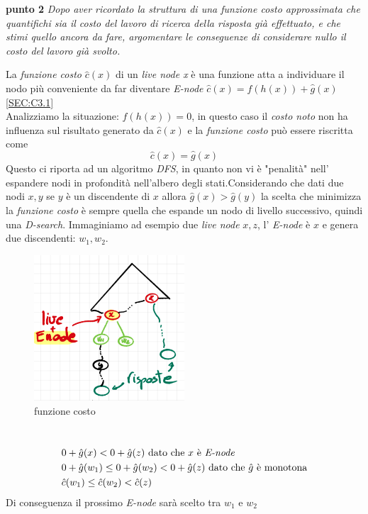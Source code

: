 \documentclass[a4paper]{article}
\begin{document}
\textbf{punto 2}
\emph{Dopo aver ricordato la struttura di una funzione costo approssimata che quantifichi sia il costo del lavoro di ricerca della risposta già effettuato, e che stimi quello ancora da fare, argomentare le conseguenze di considerare nullo il costo del lavoro già svolto.}
\begin{adjustwidth}{.8cm}{0cm}
	La \textit{funzione costo} $\hat c(x)$ di un \textit{live node x} è una funzione atta a individuare il nodo più conveniente da far diventare \textit{E-node} $\hat c(x) = f(h(x)) + \hat g(x)$ \ref{SEC:C3.1}\\
Analizziamo la situazione: $f(h(x)) =0$, in questo caso il \textit{costo noto} non ha influenza sul risultato generato da $\hat c(x)$ e la \textit{funzione costo} può essere riscritta come $$\hat c(x) = \hat g(x)$$
Questo ci riporta ad un algoritmo \textit{DFS}, in quanto non vi è "penalità" nell' espandere nodi in profondità nell'albero degli stati.Considerando che dati due nodi $x,y$ se $y$ è un discendente di $x$ allora $\hat g(x) > \hat g(y)$ la scelta che minimizza la \textit{funzione costo} è sempre quella che espande un nodo di livello successivo, quindi una \textit{D-search}.
Immaginiamo ad esempio due \textit{live node} $x,z$, l' \textit{E-node} è $x$ e genera due discendenti: $w_1, w_2$.\\
\begin{figure}[!ht]
\centering
\includegraphics[width=0.5\textwidth]{./img/C3_next.png}
\caption{funzione costo} \label{FIG:C3_next1}
\end{figure}\\

		\begin{align}
			&0 + \hat g(x) < 0 + \hat g(z) \text{ dato che $x$ è \textit{E-node}} \notag \\
			&0 + \hat g(w_1) \leq 0 + \hat g(w_2) < 0 + \hat g(z) \text{ dato che $\hat g$ è monotona} \notag\\
			&\hat c(w_1) \leq \hat c(w_2) < \hat c(z) \notag
	        \end{align}
		Di conseguenza il prossimo \textit{E-node} sarà scelto tra $w_1$ e $w_2$
\end{adjustwidth}
\end{document}
